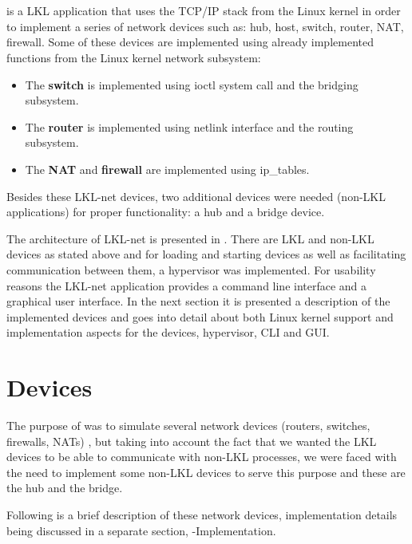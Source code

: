 \section{\project}
\label{sec:lkl-net}
\textbf{\project} is a LKL application that uses the  TCP/IP stack from the Linux kernel in order to implement a series of network devices such as: hub, host, switch, router, NAT, firewall. Some of these devices are implemented using already implemented functions from the Linux kernel network subsystem: 
\begin{itemize}
\item The \textbf{switch} is implemented using ioctl system call and the bridging subsystem. 
\item The \textbf{router} is implemented using netlink interface and the routing subsystem.
\item The \textbf{NAT} and \textbf{firewall} are implemented using ip_tables. 
\end{itemize} 
Besides these LKL-net devices, two additional devices were needed (non-LKL applications) for proper functionality: a hub and a bridge device.

The architecture of LKL-net is presented in .
There are LKL and non-LKL devices as stated above and for loading and starting devices as well as 
facilitating communication between them, a hypervisor was implemented. For usability reasons the LKL-net 
application provides a command line interface and a graphical user interface.
In the next section it is presented a description of the implemented devices and  
goes into detail about both Linux kernel support and implementation aspects for the devices, hypervisor, CLI and GUI. 
\section{Devices}
\label{sec:devices}
The purpose of \project was to simulate several network devices (routers, switches, firewalls, NATs) , but taking into account the fact that we wanted the LKL devices to be able to communicate with non-LKL processes, we were faced with the need to implement some non-LKL devices to serve this purpose and these are the hub and the bridge.

Following is a brief description of these network devices, implementation details being discussed in a separate section,  -Implementation.

